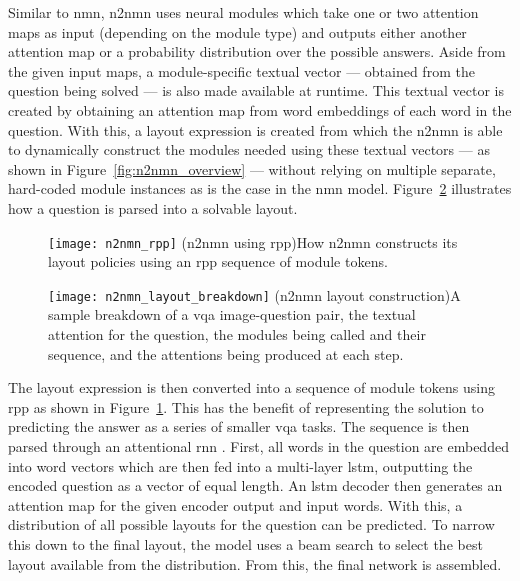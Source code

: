 Similar to \acrshort{nmn}, \acrshort{n2nmn} uses neural modules which take one or two attention maps as input (depending on the module type) and outputs either another attention map or a probability distribution over the possible answers.
Aside from the given input maps, a module-specific textual vector --- obtained from the question being solved --- is also made available at runtime.
This textual vector is created by obtaining an attention map from word embeddings of each word in the question.
With this, a layout expression is created from which the \acrshort{n2nmn} is able to dynamically construct the modules needed using these textual vectors — as shown in Figure~\ref{fig:n2nmn_overview} — without relying on multiple separate, hard-coded module instances as is the case in the \acrshort{nmn} model.
Figure~\ref{fig:n2nmn_layout_breakdown} illustrates how a question is parsed into a solvable layout.

\begin{figure}[htbp]
    \centering
    \texttt{[image: n2nmn\_rpp]}
    \captionsource(\acrshort{n2nmn} using \acrshort{rpp}){How \acrshort{n2nmn} constructs its layout policies using an \acrshort{rpp} sequence of module tokens. \label{fig:n2nmn_rpp}}{\citeauthor{hu_learning_2017}\cite{hu_learning_2017}}
\end{figure}

\begin{figure}[htbp]
    \centering
    \texttt{[image: n2nmn\_layout\_breakdown]}
    \captionsource(\acrshort{n2nmn} layout construction){A sample breakdown of a \acrshort{vqa} image-question pair, the textual attention for the question, the modules being called and their sequence, and the attentions being produced at each step.\label{fig:n2nmn_layout_breakdown}}{\citeauthor{hu_learning_2017}\cite{hu_learning_2017}}
\end{figure}

The layout expression is then converted into a sequence of module tokens using \acrlong{rpp} as shown in Figure~\ref{fig:n2nmn_rpp}. This has the benefit of representing the solution to predicting the answer as a series of smaller \acrshort{vqa} tasks.
The sequence is then parsed through an attentional \gls{rnn} \cite{bahdanau_neural_2016}. First, all words in the question are embedded into word vectors which are then fed into a multi-layer \gls{lstm}, outputting the encoded question as a vector of equal length.
An \acrshort{lstm} decoder then generates an attention map for the given encoder output and input words.
With this, a distribution of all possible layouts for the question can be predicted.
To narrow this down to the final layout, the model uses a beam search to select the best layout available from the distribution. From this, the final network is assembled.

